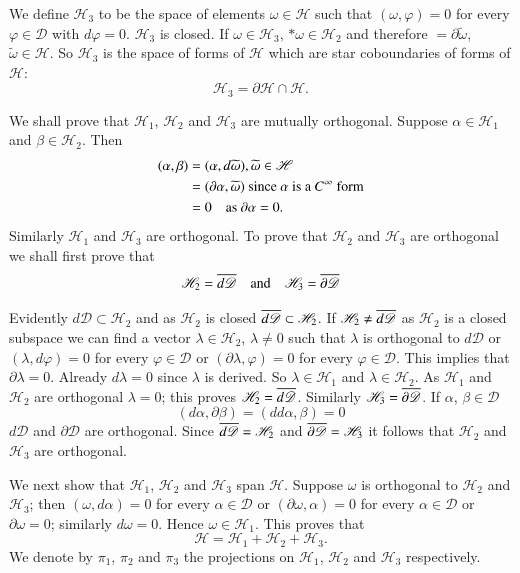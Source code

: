 We define $\mathscr{H}_{3}$ to be the space of elements
$\omega\in\mathscr{H}$ such that $(\omega, \varphi)=0$ for every
$\varphi\in \mathscr{D}$ with $d\varphi=0$. $\mathscr{H}_{3}$ is
closed. If $\omega\in \mathscr{H}_{3}$, $\ast\omega\in\mathscr{H}_{2}$
and therefore $=\partial \widetilde{\omega}$,
$\widetilde{\omega}\in\mathscr{H}$. So $\mathscr{H}_{3}$ is the space
of forms of $\mathscr{H}$ which are star coboundaries of forms of
$\mathscr{H}$: 
$$
\mathscr{H}_{3}=\partial \mathscr{H}\cap \mathscr{H}.
$$

We shall prove that $\mathscr{H}_{1}$, $\mathscr{H}_{2}$ and
$\mathscr{H}_{3}$ are mutually orthogonal\pageoriginale. Suppose
$\alpha\in\mathscr{H}_{1}$ and $\beta\in \mathscr{H}_{2}$. Then
\begin{align*}
(\alpha,\beta) &=
  (\alpha,d\widetilde{\omega}),\widetilde{\omega}\in\mathscr{H}\\
&= (\partial\alpha,\widetilde{\omega})\text{ since } \alpha \text{ is
    a }C^{\infty}\text{ form}\\
&=0\text{\quad as } \partial\alpha=0.
\end{align*}
Similarly $\mathscr{H}_{1}$ and $\mathscr{H}_{3}$ are orthogonal. To
prove that $\mathscr{H}_{2}$ and $\mathscr{H}_{3}$ are orthogonal we
shall first prove that
$$
\mathscr{H}_{2}=\overline{d\mathscr{D}}\quad\text{and}\quad
\mathscr{H}_{3}=\overline{\partial\mathscr{D}} 
$$

Evidently $d\mathscr{D}\subset \mathscr{H}_{2}$ and as
$\mathscr{H}_{2}$ is closed $\overline{d\mathscr{D}}\subset
\mathscr{H}_{2}$. If $\mathscr{H}_{2}\neq \overline{d\mathscr{D}}$ as
$\mathscr{H}_{2}$ is a closed subspace we can find a vector
$\lambda\in \mathscr{H}_{2}$, $\lambda\neq 0$ such that $\lambda$ is
orthogonal to $d\mathscr{D}$ or $(\lambda,d\varphi)=0$ for every
$\varphi\in\mathscr{D}$ or $(\partial\lambda,\varphi)=0$ for every
$\varphi\in\mathscr{D}$. This implies that
$\partial\lambda=0$. Already $d\lambda=0$ since $\lambda$ is
derived. So $\lambda\in\mathscr{H}_{1}$ and
$\lambda\in\mathscr{H}_{2}$. As $\mathscr{H}_{1}$ and
$\mathscr{H}_{2}$ are orthogonal $\lambda=0$; this proves
$\mathscr{H}_{2}=\overline{d\mathscr{D}}$. Similarly
$\mathscr{H}_{3}=\overline{\partial \mathscr{D}}$. If $\alpha$,
$\beta\in\mathscr{D}$ 
$$
(d\alpha,\partial\beta)=(dd\alpha,\beta)=0
$$
\iec $d\mathscr{D}$ and $\partial \mathscr{D}$ are orthogonal. Since
$\overline{d\mathscr{D}}=\mathscr{H}_{2}$ and
$\overline{\partial\mathscr{D}}=\mathscr{H}_{3}$ it follows that
$\mathscr{H}_{2}$ and $\mathscr{H}_{3}$ are orthogonal.

We next show that $\mathscr{H}_{1}$, $\mathscr{H}_{2}$ and
$\mathscr{H}_{3}$ span $\mathscr{H}$. Suppose $\omega$ is orthogonal
to $\mathscr{H}_{2}$ and $\mathscr{H}_{3}$; then $(\omega,d\alpha)=0$
for every $\alpha\in\mathscr{D}$ or $(\partial\omega,\alpha)=0$ for
every $\alpha\in \mathscr{D}$ or $\partial \omega=0$; similarly
$d\omega=0$. Hence $\omega\in\mathscr{H}_{1}$. This proves that 
$$
\mathscr{H}=\mathscr{H}_{1}+\mathscr{H}_{2}+\mathscr{H}_{3}.
$$\pageoriginale
We denote by $\pi_{1}$, $\pi_{2}$ and $\pi_{3}$ the projections on
$\mathscr{H}_{1}$, $\mathscr{H}_{2}$ and $\mathscr{H}_{3}$
respectively.

